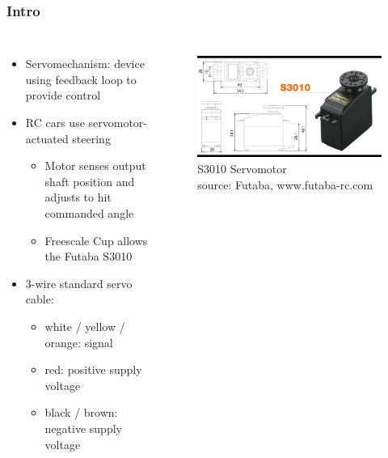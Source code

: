 \documentclass{beamer}
\begin{document}
\begin{frame}
\frametitle{Intro}
\begin{columns}[t]
\begin{itemize}
  \item Servomechanism: device using feedback loop to provide control
  \item RC cars use servomotor-actuated steering
  \begin{itemize}
    \item Motor senses output shaft position and adjusts to hit commanded angle
    \item Freescale Cup allows the Futaba S3010
  \end{itemize}
  \item 3-wire standard servo cable:
  \begin{itemize}
    \item white / yellow / orange: signal
    \item red: positive supply voltage
    \item black / brown: negative supply voltage
  \end{itemize}
\end{itemize}

\begin{figure}
  \centering
  \includegraphics[width=1.0\columnwidth]{images-dis3/specs-futm0043} \\
  S3010 Servomotor \\
  {\tiny source: Futaba, www.futaba-rc.com}
\end{figure}
\end{columns}
\end{frame}


\end{document}
